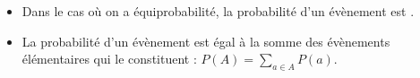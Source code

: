 \TCDLessonStyleOff
\begin{fiche}
	\begin{prop}
		\begin{itemize}
			\item Dans le cas o\`u on a \'equiprobabilit\'e, la probabilit\'e d'un \'ev\`enement est
				.
			\item 
				La probabilit\'e d'un \'ev\`enement est \'egal \`a la somme des \'ev\`enements \'el\'ementaires qui le constituent :
				$\displaystyle{P(A) = \sum_{a \in A} P({a})}$.

\end{itemize}
\end{prop}
\end{fiche}
